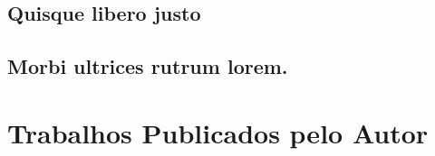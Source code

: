 \documentclass[
	12pt,				%
	openright,			%
	twoside,			%
	a4paper,			%
	tcc,			%
]{cct-uenp}
\begin{document}

%
\begin{apendicesenv}

\partapendices

\chapter{Quisque libero justo}

\lipsum[50]

\end{apendicesenv}


%

\begin{anexosenv}

\partanexos

\chapter{Morbi ultrices rutrum lorem.}
\lipsum[30]

\end{anexosenv}


%
\chapter*{Trabalhos Publicados pelo Autor}
\end{document}
